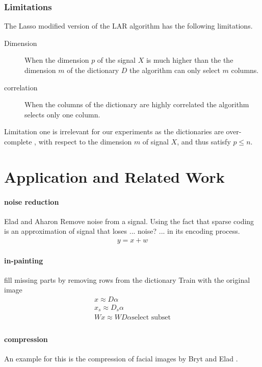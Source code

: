 \subsubsection*{Limitations}
The Lasso modified version of the LAR algorithm has the following limitations.
\begin{description}
 \item[Dimension] When the dimension $p$ of the signal $X$ is much higher than
the the dimension $m$ of the dictionary $D$ the algorithm can only select $m$
columns.
  \item[correlation] When the columns of the dictionary are highly correlated
the algorithm selects only one column.
\end{description}

Limitation one is irrelevant for our experiments as the dictionaries are over-complete 
, with respect to the dimension $m$ of signal $X$, and thus satisfy $p\leq n$.

\section{Application and Related Work}

\paragraph{noise reduction}
Elad and Aharon\cite{Elad2006}
Remove noise from a signal. 
Using the fact that sparse coding is an approximation of signal that loses ...
noise? ... in its encoding process. 
\begin{align*}
y = x + w
\end{align*}




\paragraph{in-painting}
fill missing parts by removing rows from the dictionary
Train with the original image
\begin{align*}
x \approx D\alpha\\
x_s \approx D_s\alpha\\
Wx \approx WD\alpha\text{select subset}\\
\end{align*}

\cite{mairal08sparse}

\paragraph{compression} \cite{Murray2006} \cite{Lewicki1999} An example for this
is the compression of facial images by Bryt and Elad \cite{Bryt2008}.

